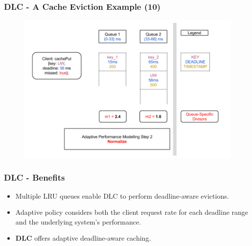 \documentclass{beamer}
\newcommand{\myv}{\vspace{3 mm}}
\begin{document}
\begin{frame}
  \frametitle{DLC - A Cache Eviction Example (10)}
  \begin{figure}
    \begin{center}
      \centerline{\includegraphics[scale=0.33]{img/DLC_V6_10.png}}
    \end{center}
  \end{figure}
\end{frame}

\begin{frame}
  \frametitle{DLC - Benefits}
  \vspace{-15 mm}
  \begin{itemize}
  \item Multiple LRU queues enable DLC to perform deadline-aware evictions.
    \myv
  \item Adaptive policy considers both the client request rate for each
    deadline range and the underlying system's performance.  \myv

  \item \textbf{DLC} offers adaptive deadline-aware caching.
  \end{itemize}
\end{frame}
\end{document}
